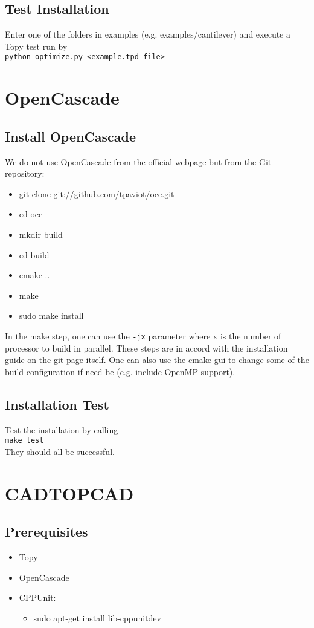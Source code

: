 \documentclass[11pt,a4paper,bibtotoc,idxtotoc,headsepline,footsepline,footexclude,DIV13,oneside]{scrbook}
\begin{document}
	\section{Test Installation}
	Enter one of the folders in examples (e.g. examples/cantilever) and execute a Topy test run by \\
	\texttt{python optimize.py <example.tpd-file>} \\
	
	\chapter{OpenCascade}
	\section{Install OpenCascade}
	We do not use OpenCascade from the official webpage but from the Git repository:
	\begin{itemize}
	\item git clone git://github.com/tpaviot/oce.git
	\item cd oce
	\item mkdir build
	\item cd build
	\item cmake .. 
	\item make 
	\item sudo make install  
	\end{itemize}
	In the make step, one can use the \texttt{-jx} parameter where x is the number of processor to build in parallel. These steps are in accord with the installation guide on the git page itself. One can also use the cmake-gui  to change some of the build configuration if need be (e.g. include OpenMP support).
	\section{Installation Test}
	Test the installation by calling \\
	\texttt{make test} \\
	They should all be successful.
	
	\chapter{CADTOPCAD}
	\section{Prerequisites}
	\begin{itemize}
	\item Topy
	\item OpenCascade
	\item CPPUnit:
		\begin{itemize}
		\item sudo apt-get install lib-cppunitdev
		\end{itemize}
	\end{itemize}

  	\clearemptydoublepage
	
 
\end{document}
